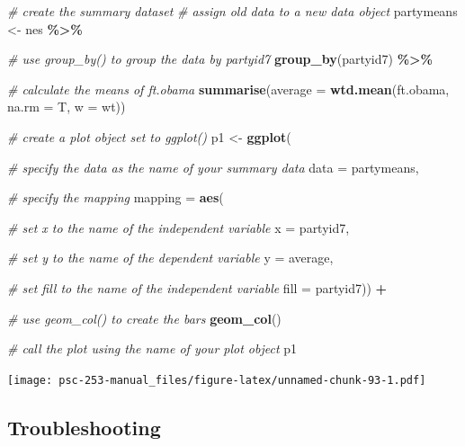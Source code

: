 \documentclass[
]{book}
\newenvironment{Shaded}{\begin{snugshade}}{\end{snugshade}}
\newcommand{\AttributeTok}[1]{\textcolor[rgb]{0.13,0.29,0.53}{#1}}
\newcommand{\CommentTok}[1]{\textcolor[rgb]{0.56,0.35,0.01}{\textit{#1}}}
\newcommand{\FunctionTok}[1]{\textcolor[rgb]{0.13,0.29,0.53}{\textbf{#1}}}
\newcommand{\NormalTok}[1]{#1}
\newcommand{\OtherTok}[1]{\textcolor[rgb]{0.56,0.35,0.01}{#1}}
\newcommand{\SpecialCharTok}[1]{\textcolor[rgb]{0.81,0.36,0.00}{\textbf{#1}}}
\begin{document}
\begin{Shaded}
\begin{Highlighting}[]
\CommentTok{\# create the summary dataset}
\CommentTok{\# assign old data to a new data object}
\NormalTok{partymeans }\OtherTok{\textless{}{-}}\NormalTok{ nes }\SpecialCharTok{\%\textgreater{}\%}
  
  \CommentTok{\# use group\_by() to group the data by partyid7}
  \FunctionTok{group\_by}\NormalTok{(partyid7) }\SpecialCharTok{\%\textgreater{}\%}
  
  \CommentTok{\# calculate the means of ft.obama}
  \FunctionTok{summarise}\NormalTok{(}\AttributeTok{average =} \FunctionTok{wtd.mean}\NormalTok{(ft.obama, }\AttributeTok{na.rm =}\NormalTok{ T,}
                               \AttributeTok{w =}\NormalTok{ wt))}

\CommentTok{\# create a plot object set to \textasciigrave{}ggplot()\textasciigrave{}}
\NormalTok{p1 }\OtherTok{\textless{}{-}} \FunctionTok{ggplot}\NormalTok{(}
  
  \CommentTok{\# specify the data as the name of your summary data}
  \AttributeTok{data =}\NormalTok{ partymeans,}
  
  \CommentTok{\# specify the mapping}
  \AttributeTok{mapping =} \FunctionTok{aes}\NormalTok{(}
    
    \CommentTok{\# set x to the name of the independent variable}
    \AttributeTok{x =}\NormalTok{ partyid7,}
    
    \CommentTok{\# set y to the name of the dependent variable}
    \AttributeTok{y =}\NormalTok{ average,}
    
    \CommentTok{\# set \textasciigrave{}fill\textasciigrave{} to the name of the independent variable}
    \AttributeTok{fill =}\NormalTok{ partyid7)) }\SpecialCharTok{+}
  
  \CommentTok{\# use \textasciigrave{}geom\_col() to create the bars}
  \FunctionTok{geom\_col}\NormalTok{()}

\CommentTok{\# call the plot using the name of your plot object}
\NormalTok{p1}
\end{Highlighting}
\end{Shaded}

\texttt{[image: psc-253-manual\_files/figure-latex/unnamed-chunk-93-1.pdf]}

\hypertarget{troubleshooting-36}{%
\subsection{Troubleshooting}\label{troubleshooting-36}}
\end{document}
